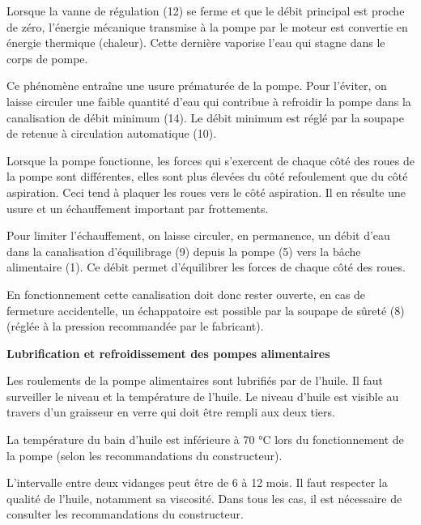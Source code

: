 Lorsque la vanne de régulation (12) se ferme et que le débit principal est proche de zéro, l’énergie mécanique transmise à la pompe par le moteur est convertie en énergie thermique (chaleur). Cette dernière vaporise l’eau qui stagne dans le corps de pompe.
\vspace{0.3cm}

Ce phénomène entraîne une usure prématurée de la pompe. Pour l’éviter, on laisse circuler une faible quantité d’eau qui contribue à refroidir la pompe dans la canalisation de débit minimum (14).
Le débit minimum est réglé par la soupape de retenue à circulation automatique (10).
\vspace{0.3cm}

Lorsque la pompe fonctionne, les forces qui s’exercent de chaque côté des roues de la pompe sont différentes, elles sont plus élevées du côté refoulement que du côté aspiration. Ceci tend à plaquer les roues vers le côté aspiration. Il en résulte une usure et un échauffement important par frottements.
\vspace{0.3cm}

Pour limiter l’échauffement, on laisse circuler, en permanence, un débit d’eau dans la canalisation d’équilibrage (9) depuis la pompe (5) vers la bâche alimentaire (1).
Ce débit permet d’équilibrer les forces de chaque côté des roues.
\vspace{0.3cm}

En fonctionnement cette canalisation doit donc rester ouverte, en cas de fermeture accidentelle, un échappatoire est possible par la soupape de sûreté (8) (réglée à la pression recommandée par le fabricant).



\vspace{0.3cm}
\textbf{Lubrification et refroidissement des pompes alimentaires}
\vspace{0.3cm}

Les roulements de la pompe alimentaires sont lubrifiés par de l’huile. Il faut surveiller le niveau et la température de l’huile. Le niveau d’huile est visible au travers d’un graisseur en verre qui doit être rempli aux deux tiers.
\vspace{0.3cm}

La température du bain d’huile est inférieure à 70 °C lors du fonctionnement de la pompe (selon les recommandations du constructeur).
\vspace{0.3cm}

L’intervalle entre deux vidanges peut être de 6 à 12 mois. Il faut respecter la qualité de l’huile, notamment sa viscosité. Dans tous les cas, il est nécessaire de consulter les recommandations du constructeur.
\vspace{0.3cm}

